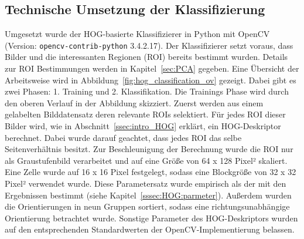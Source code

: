 \subsection{Technische Umsetzung der Klassifizierung} \label{ssec:implementation}
Umgesetzt wurde der HOG-basierte Klassifizierer in Python mit OpenCV (Version: \texttt{opencv-contrib-python} 3.4.2.17). Der Klassifizierer setzt voraus, dass Bilder und die interessanten Regionen (ROI) bereits bestimmt wurden. Details zur ROI Bestimmungen werden in Kapitel~\ref{sec:PCA} gegeben. Eine Übersicht der Arbeitsweise wird in Abbildung~\ref{fig:hog_classification_ov} gezeigt. Dabei gibt es zwei Phasen: 1. Training und 2. Klassifikation. Die Trainings Phase wird durch den oberen Verlauf in der Abbildung skizziert. Zuerst werden aus einem gelabelten Bilddatensatz deren relevante ROIs selektiert. Für jedes ROI dieser Bilder wird, wie in Abschnitt~\ref{ssec:intro_HOG} erklärt, ein HOG-Deskriptor berechnet. Dabei wurde darauf geachtet, dass jedes ROI das selbe Seitenverhältnis besitzt. Zur Beschleunigung der Berechnung wurde die ROI nur als Graustufenbild verarbeitet und auf eine Größe von 64 x 128 Pixel² skaliert. Eine Zelle wurde auf 16 x 16 Pixel festgelegt, sodass eine Blockgröße von 32 x 32 Pixel² verwendet wurde. Diese Parametersatz wurde empirisch als der mit den Ergebnissen bestimmt (siehe Kapitel~\ref{sssec:HOG:parmeter}). Außerdem wurden die Orientierungen in neun Gruppen sortiert, sodass eine richtungsunabhängige Orientierung betrachtet wurde. Sonstige Parameter des HOG-Deskriptors wurden auf den entsprechenden Standardwerten der OpenCV-Implementierung belassen. 

